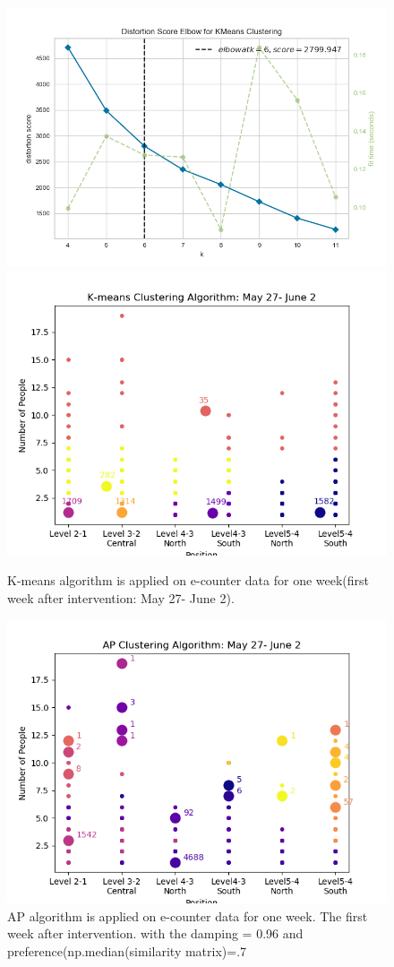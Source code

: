 \begin{figure}[!h]
    \centering
    \includegraphics[width=.49\textwidth]{image/Chapters/Chapter6/elbowAfterInt.png}
    \includegraphics[width=.49\textwidth]{image/Chapters/Chapter6/kmeans1WeekAfter.png}
    \caption{K-means algorithm is applied on e-counter data for one week(first week after intervention: May 27- June 2).}
    \label{elbkmean}
\end{figure}   




\begin{figure}[!h]
    \centering
    \includegraphics[width = 11 cm]{image/Chapters/Chapter6/ApFirstWeekAfterInt.png}
    \caption{AP algorithm is applied on e-counter data for one week. The first week after intervention. with the damping = 0.96 and preference(np.median(similarity matrix)=.7  }
    \label{apaft}
\end{figure}




